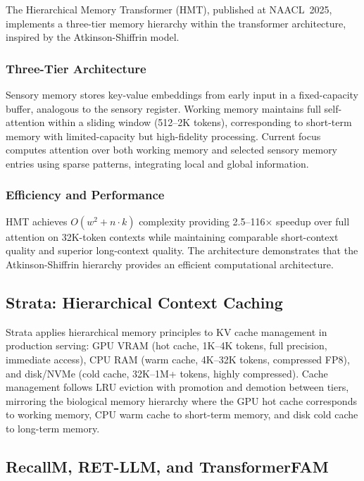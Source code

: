 \documentclass[11pt,letterpaper]{article}
\begin{document}
The Hierarchical Memory Transformer (HMT), published at NAACL~2025, implements a three-tier memory hierarchy within the transformer architecture, inspired by the Atkinson-Shiffrin model.

\subsubsection{Three-Tier Architecture}

Sensory memory stores key-value embeddings from early input in a fixed-capacity buffer, analogous to the sensory register. Working memory maintains full self-attention within a sliding window (512--2K tokens), corresponding to short-term memory with limited-capacity but high-fidelity processing. Current focus computes attention over both working memory and selected sensory memory entries using sparse patterns, integrating local and global information.

\subsubsection{Efficiency and Performance}

HMT achieves $O(w^2 + n \cdot k)$ complexity providing 2.5--116$\times$ speedup over full attention on 32K-token contexts while maintaining comparable short-context quality and superior long-context quality. The architecture demonstrates that the Atkinson-Shiffrin hierarchy provides an efficient computational architecture.

\subsection{Strata: Hierarchical Context Caching}

Strata applies hierarchical memory principles to KV cache management in production serving: GPU VRAM (hot cache, 1K--4K tokens, full precision, immediate access), CPU RAM (warm cache, 4K--32K tokens, compressed FP8), and disk/NVMe (cold cache, 32K--1M+ tokens, highly compressed). Cache management follows LRU eviction with promotion and demotion between tiers, mirroring the biological memory hierarchy where the GPU hot cache corresponds to working memory, CPU warm cache to short-term memory, and disk cold cache to long-term memory.

\subsection{RecallM, RET-LLM, and TransformerFAM}
\end{document}
